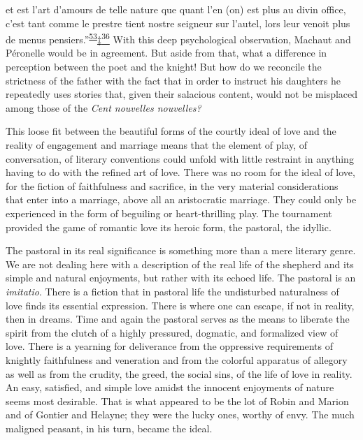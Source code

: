 et est l'art d'amours de telle nature que quant l'en (on) est plus au
divin office, c'est tant comme le prestre tient nostre seigneur sur
l'autel, lors leur venoit plus de menus
pensiers.''\textsuperscript{\protect\hypertarget{11_Chapter_Four__THE_FORMS_OF_LOVE.xhtmlux5cux23id_1383}{\protect\hyperlink{23_NOTES.xhtmlux5cux23id_1384}{53}}}\protect\hypertarget{11_Chapter_Four__THE_FORMS_OF_LOVE.xhtmlux5cux23id_2317}{\protect\hyperlink{23_NOTES.xhtmlux5cux23id_2318}{‡\textsuperscript{36}}}
With this deep psychological observation, Machaut and Péronelle would be
in agreement. But aside from that, what a difference in perception
between the poet and the knight! But how do we reconcile the strictness
of the father with the fact that in order to instruct his daughters he
repeatedly
\protect\hypertarget{11_Chapter_Four__THE_FORMS_OF_LOVE.xhtmlux5cux23page_150}{}{}uses
stories that, given their salacious content, would not be misplaced
among those of the \emph{Cent nouvelles nouvelles?}

This loose fit between the beautiful forms of the courtly ideal of love
and the reality of engagement and marriage means that the element of
play, of conversation, of literary conventions could unfold with little
restraint in anything having to do with the refined art of love. There
was no room for the ideal of love, for the fiction of faithfulness and
sacrifice, in the very material considerations that enter into a
marriage, above all an aristocratic marriage. They could only be
experienced in the form of beguiling or heart-thrilling play. The
tournament provided the game of romantic love its heroic form, the
pastoral, the idyllic.

The pastoral in its real significance is something more than a mere
literary genre. We are not dealing here with a description of the real
life of the shepherd and its simple and natural enjoyments, but rather
with its echoed life. The pastoral is an \emph{imitatio}. There is a
fiction that in pastoral life the undisturbed naturalness of love finds
its essential expression. There is where one can escape, if not in
reality, then in dreams. Time and again the pastoral serves as the means
to liberate the spirit from the clutch of a highly pressured, dogmatic,
and formalized view of love. There is a yearning for deliverance from
the oppressive requirements of knightly faithfulness and veneration and
from the colorful apparatus of allegory as well as from the crudity, the
greed, the social sins, of the life of love in reality. An easy,
satisfied, and simple love amidst the innocent enjoyments of nature
seems most desirable. That is what appeared to be the lot of Robin and
Marion and of Gontier and Helayne; they were the lucky ones, worthy of
envy. The much maligned peasant, in his turn, became the ideal.


